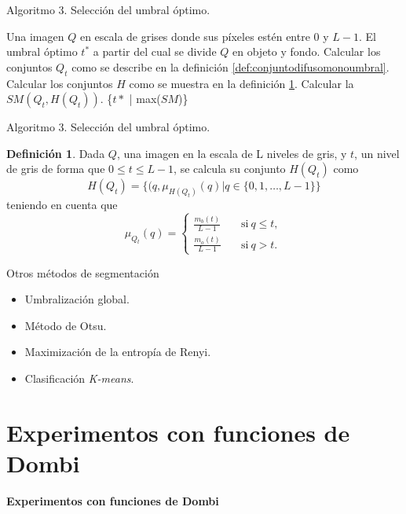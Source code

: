 \documentclass{beamer}
\theoremstyle{plain} %
\theoremstyle{definition}
\newtheorem{defn}{Definición}
\begin{document}
\begin{frame}{Algoritmo 3. Selección del umbral óptimo.}
  \begin{algorithm}[H]%
  \begin{algorithmic}[1]
  \REQUIRE Una imagen $Q$ en escala de grises donde sus píxeles estén entre $0$ y $L-1$.
  \ENSURE El umbral óptimo $t^*$ a partir del cual se divide $Q$ en objeto y fondo.
  \STATE Calcular los conjuntos $Q_t$ como se describe en la definición \ref{def:conjuntodifusomonoumbral}.
  \STATE Calcular los conjuntos $H$ como se muestra en la definición \ref{def:conjuntoHmonoumbral}.
  \STATE Calcular la $SM(Q_t, H(Q_t))$.
  \ENDFOR
  \RETURN \{$t*$ | max($SM$)\}
  \end{algorithmic}
  \caption{Selección del umbral óptimo}\label{alg:algoritmo3}
  \end{algorithm}
\end{frame}

\begin{frame}{Algoritmo 3. Selección del umbral óptimo.}
  \begin{defn}\label{def:conjuntoHmonoumbral}
  Dada $Q$, una imagen en la escala de L niveles de gris, y $t$, un nivel de gris de forma que $0\leq t\leq L-1$, se calcula su conjunto $H(Q_t)$ como
  $$H(Q_t) = \{(q, \mu_{H(Q_t)}(q)|q\in \{0,1,\dots, L-1\}\}$$ 
  teniendo en cuenta que
  $$\mu_{Q_t}(q) = \left\{ \begin{aligned}
      \frac{m_b(t)}{L-1} & \quad\text{si}\ q\leq t,\\
      \frac{m_o(t)}{L-1} & \quad\text{si}\ q> t.
   \end{aligned}\right.$$
   \end{defn}
\end{frame}

\begin{frame}{Otros métodos de segmentación}
  \begin{itemize}
    \item Umbralización global.
    \item Método de Otsu.
    \item Maximización de la entropía de Renyi.
    \item Clasificación {\em K-means}.
  \end{itemize}
\end{frame}

\section{Experimentos con funciones de Dombi}
\begin{frame}
  \bfseries\Large\centering  Experimentos con funciones de Dombi
\end{frame}
\end{document}

